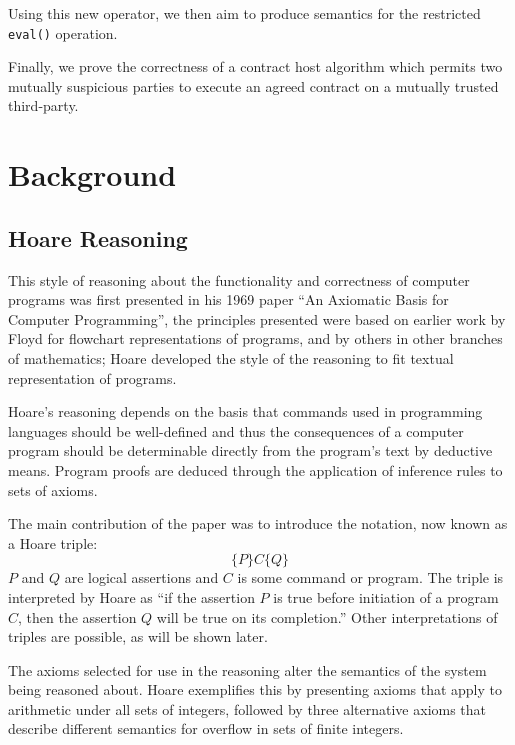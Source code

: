 \documentclass[a4paper]{report}
\begin{document}
  Using this new operator, we then aim to produce semantics for the restricted
  \texttt{eval()} operation.

  Finally, we prove the correctness of a contract host algorithm
  \cite{contract-host-algo} which permits
  two mutually suspicious parties to execute an agreed contract on a mutually
  trusted third-party.

\chapter{Background}
\section{Hoare Reasoning}
  This style of reasoning about the functionality and correctness of computer
  programs was first presented in his 1969 paper ``An Axiomatic Basis for
  Computer Programming''\cite{Hoare1969Axiom}, the principles presented were
  based on earlier work by Floyd\cite{floyd1967assigning} for flowchart
  representations of programs, and by others in other branches of mathematics;
  Hoare developed the style of the reasoning to fit textual representation of
  programs.

  Hoare's reasoning depends on the basis that commands used in programming
  languages should be well-defined and thus the consequences of a computer
  program should be determinable directly from the program's text by deductive
  means. Program proofs are deduced through the application of inference rules
  to sets of axioms.

  The main contribution of the paper was to introduce the notation, now known as
  a Hoare triple:
    \[ \{P\} C \{Q\} \]
  $P$ and $Q$ are logical assertions and $C$ is some command or program. The
  triple is interpreted by Hoare as ``if the assertion $P$ is true before
  initiation of a program $C$, then the assertion $Q$ will be true on its
  completion.'' Other interpretations of triples are possible, as will be shown
  later.

  The axioms selected for use in the reasoning alter the semantics of the system
  being reasoned about. Hoare exemplifies this by presenting axioms that apply
  to arithmetic under all sets of integers, followed by three alternative axioms
  that describe different semantics for overflow in sets of finite integers.
\end{document}
